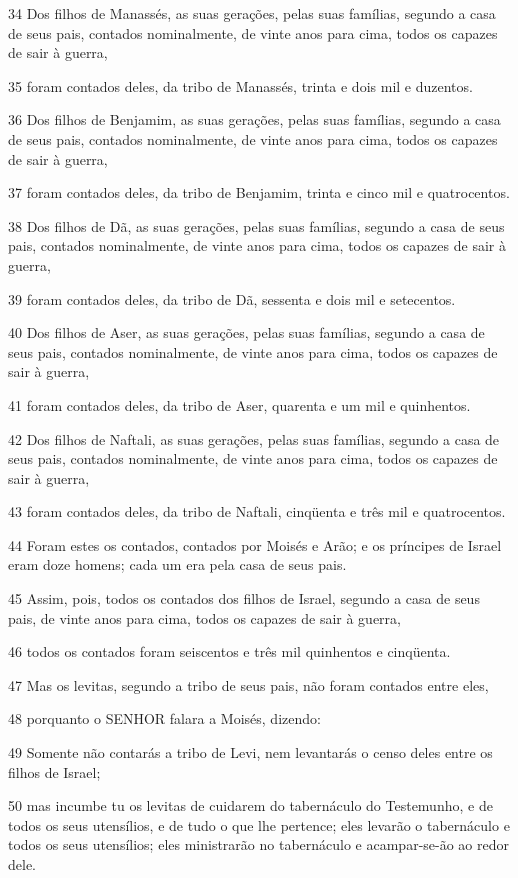 \par 34 Dos filhos de Manassés, as suas gerações, pelas suas famílias, segundo a casa de seus pais, contados nominalmente, de vinte anos para cima, todos os capazes de sair à guerra,
\par 35 foram contados deles, da tribo de Manassés, trinta e dois mil e duzentos.
\par 36 Dos filhos de Benjamim, as suas gerações, pelas suas famílias, segundo a casa de seus pais, contados nominalmente, de vinte anos para cima, todos os capazes de sair à guerra,
\par 37 foram contados deles, da tribo de Benjamim, trinta e cinco mil e quatrocentos.
\par 38 Dos filhos de Dã, as suas gerações, pelas suas famílias, segundo a casa de seus pais, contados nominalmente, de vinte anos para cima, todos os capazes de sair à guerra,
\par 39 foram contados deles, da tribo de Dã, sessenta e dois mil e setecentos.
\par 40 Dos filhos de Aser, as suas gerações, pelas suas famílias, segundo a casa de seus pais, contados nominalmente, de vinte anos para cima, todos os capazes de sair à guerra,
\par 41 foram contados deles, da tribo de Aser, quarenta e um mil e quinhentos.
\par 42 Dos filhos de Naftali, as suas gerações, pelas suas famílias, segundo a casa de seus pais, contados nominalmente, de vinte anos para cima, todos os capazes de sair à guerra,
\par 43 foram contados deles, da tribo de Naftali, cinqüenta e três mil e quatrocentos.
\par 44 Foram estes os contados, contados por Moisés e Arão; e os príncipes de Israel eram doze homens; cada um era pela casa de seus pais.
\par 45 Assim, pois, todos os contados dos filhos de Israel, segundo a casa de seus pais, de vinte anos para cima, todos os capazes de sair à guerra,
\par 46 todos os contados foram seiscentos e três mil quinhentos e cinqüenta.
\par 47 Mas os levitas, segundo a tribo de seus pais, não foram contados entre eles,
\par 48 porquanto o SENHOR falara a Moisés, dizendo:
\par 49 Somente não contarás a tribo de Levi, nem levantarás o censo deles entre os filhos de Israel;
\par 50 mas incumbe tu os levitas de cuidarem do tabernáculo do Testemunho, e de todos os seus utensílios, e de tudo o que lhe pertence; eles levarão o tabernáculo e todos os seus utensílios; eles ministrarão no tabernáculo e acampar-se-ão ao redor dele.
